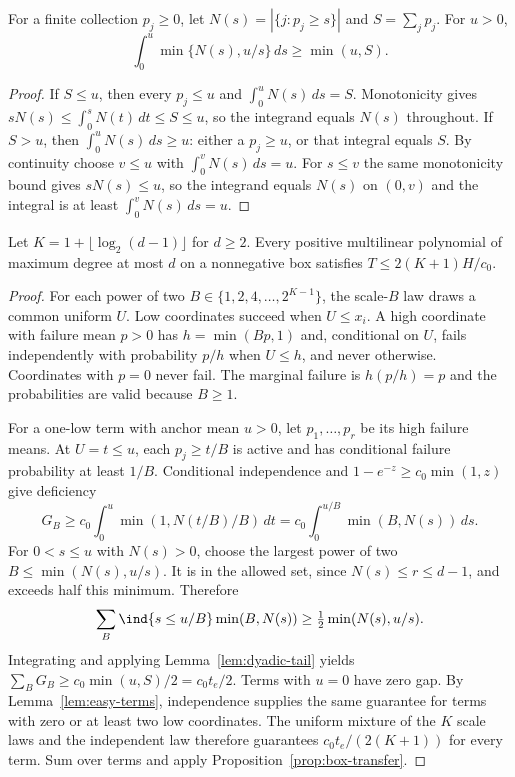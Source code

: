 \begin{lemma}\label{lem:dyadic-tail}
For a finite collection $p_j\ge0$, let $N(s)=|\{j:p_j\ge s\}|$ and
$S=\sum_jp_j$. For $u>0$,
\begin{equation}\label{eq:dyadic-tail}
 \int_0^u\min\{N(s),u/s\}\,ds\ge\min(u,S).
\end{equation}
\end{lemma}
\begin{proof}
If $S\le u$, then every $p_j\le u$ and $\int_0^uN(s)\,ds=S$.
Monotonicity gives $sN(s)\le\int_0^sN(t)\,dt\le S\le u$, so the
integrand equals $N(s)$ throughout. If $S>u$, then
$\int_0^uN(s)\,ds\ge u$: either a $p_j\ge u$, or that integral equals
$S$. By continuity choose $v\le u$ with $\int_0^vN(s)\,ds=u$.
For $s\le v$ the same monotonicity bound gives $sN(s)\le u$, so the
integrand equals $N(s)$ on $(0,v)$ and the integral is at least
$\int_0^vN(s)\,ds=u$.
\end{proof}

\begin{proposition}\label{prop:dyadic-degree}
Let $K=1+\lfloor\log_2(d-1)\rfloor$ for $d\ge2$. Every positive
multilinear polynomial of maximum degree at most $d$ on a nonnegative
box satisfies $T\le2(K+1)H/c_0$.
\end{proposition}
\begin{proof}
For each power of two $B\in\{1,2,4,\ldots,2^{K-1}\}$, the scale-$B$
law draws a common uniform $U$. Low coordinates succeed when $U\le x_i$.
A high coordinate with failure mean $p>0$ has $h=\min(Bp,1)$ and,
conditional on $U$, fails independently with probability $p/h$ when
$U\le h$, and never otherwise. Coordinates with $p=0$ never fail.
The marginal failure is $h(p/h)=p$ and the probabilities are valid
because $B\ge1$.

For a one-low term with anchor mean $u>0$, let $p_1,\ldots,p_r$ be
its high failure means. At $U=t\le u$, each $p_j\ge t/B$ is active
and has conditional failure probability at least $1/B$. Conditional
independence and $1-e^{-z}\ge c_0\min(1,z)$ give deficiency
\[
 G_B\ge c_0\int_0^u\min(1,N(t/B)/B)\,dt
       =c_0\int_0^{u/B}\min(B,N(s))\,ds.
\]
For $0<s\le u$ with $N(s)>0$, choose the largest power of two
$B\le\min(N(s),u/s)$. It is in the allowed set, since
$N(s)\le r\le d-1$, and exceeds half this minimum. Therefore
\[
 \sum_B\ind\{s\le u/B\}\min(B,N(s))
       \ge\tfrac12\min(N(s),u/s).
\]
Integrating and applying Lemma~\ref{lem:dyadic-tail} yields
$\sum_BG_B\ge c_0\min(u,S)/2=c_0t_e/2$.
Terms with $u=0$ have zero gap. By Lemma~\ref{lem:easy-terms},
independence supplies the same guarantee for terms with zero or at least
two low coordinates. The uniform mixture of the $K$ scale laws and the
independent law therefore guarantees $c_0t_e/(2(K+1))$ for every term.
Sum over terms and apply Proposition~\ref{prop:box-transfer}.
\end{proof}


